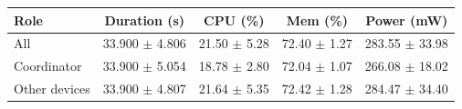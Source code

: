 \begin{tabular}{lcccc}
\hline
\textbf{Role} & \textbf{Duration (s)} & \textbf{CPU (\%)} & \textbf{Mem (\%)} & \textbf{Power (mW)} \\
\hline
All & 33.900 $\pm$ 4.806 & 21.50 $\pm$ 5.28 & 72.40 $\pm$ 1.27 & 283.55 $\pm$ 33.98 \\
Coordinator & 33.900 $\pm$ 5.054 & 18.78 $\pm$ 2.80 & 72.04 $\pm$ 1.07 & 266.08 $\pm$ 18.02 \\
Other devices & 33.900 $\pm$ 4.807 & 21.64 $\pm$ 5.35 & 72.42 $\pm$ 1.28 & 284.47 $\pm$ 34.40 \\
\hline
\end{tabular}
